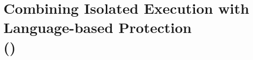 
\chapter{Combining Isolated Execution with Language-based Protection \\ ({\em \sysname{}})}










